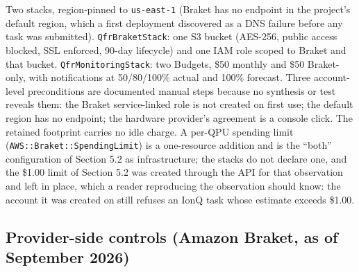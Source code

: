 \documentclass[acmsmall,screen,review]{acmart}
\begin{document}
Two stacks, region-pinned to \texttt{us-east-1} (Braket has no endpoint in the project's default region, which a first deployment discovered as a DNS failure before any task was submitted). \texttt{QfrBraketStack}: one S3 bucket (AES-256, public access blocked, SSL enforced, 90-day lifecycle) and one IAM role scoped to Braket and that bucket. \texttt{Qfr\allowbreak{}Monitoring\allowbreak{}Stack}: two Budgets, \$50 monthly and \$50 Braket-only, with notifications at 50/80/100\% actual and 100\% forecast. Three account-level preconditions are documented manual steps because no synthesis or test reveals them: the Braket service-linked role is not created on first use; the default region has no endpoint; the hardware provider's agreement is a console click. The retained footprint carries no idle charge. A per-QPU spending limit (\texttt{AWS:\allowbreak{}:\allowbreak{}Braket:\allowbreak{}:\allowbreak{}Spending\allowbreak{}Limit}) is a one-resource addition and is the ``both'' configuration of Section 5.2 as infrastructure; the stacks do not declare one, and the \$1.00 limit of Section 5.2 was created through the API for that observation and left in place, which a reader reproducing the observation should know: the account it was created on still refuses an IonQ task whose estimate exceeds \$1.00.


\subsection{Provider-side controls (Amazon Braket, as of September 2026)}
\end{document}
